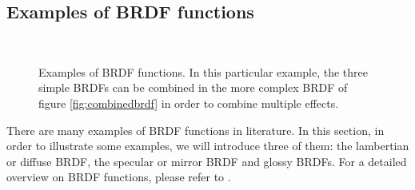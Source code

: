 \subsection{Examples of BRDF functions}

\FloatBarrier
\begin{figure}
\centering
{}
 \\
\label{fig:brdfexamples}
\caption{Examples of BRDF functions. In this particular example, the three simple BRDFs can be combined in the more complex BRDF of figure \ref{fig:combinedbrdf} in order to combine multiple effects.}
\end{figure}


There are many examples of BRDF functions in literature. In this section, in order to illustrate some examples, we will introduce three of them: the lambertian or diffuse BRDF, the specular or mirror BRDF and glossy BRDFs. For a detailed overview on BRDF functions, please refer to \citep{montes2012overview}.

